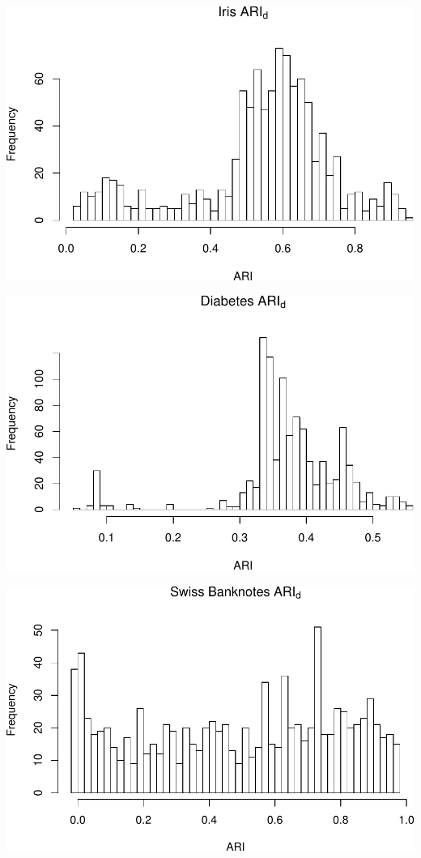 \begin{center}\includegraphics[width=1\linewidth]{Report_files/figure-latex/unnamed-chunk-18-2} \end{center}

\begin{center}\includegraphics[width=1\linewidth]{Report_files/figure-latex/unnamed-chunk-18-3} \end{center}

\begin{center}\includegraphics[width=1\linewidth]{Report_files/figure-latex/unnamed-chunk-18-4} \end{center}

